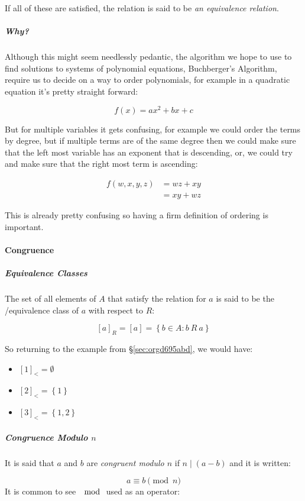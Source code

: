 \documentclass[a4paper,11pt,twoside]{article}
\begin{document}
If all of these are satisfied, the relation is said to be \emph{an
equivalence relation}.

\subparagraph{Why?}
\label{sec:org3e60f95}
Although this might seem needlessly pedantic, the algorithm we
hope to use to find solutions to systems of polynomial
equations, Buchberger's Algorithm, require us to decide on a
way to order polynomials, for example in a quadratic equation
it's pretty straight forward:

\[
      f(x) = ax^2 + bx +c
      \]

But for multiple variables it gets confusing, for example we could
order the terms by degree, but if multiple terms are of the same
degree then we could make sure that the left most variable has an
exponent that is descending, or, we could try and make sure that
the right most term is ascending:

\begin{align}
 f\left(w,x,y,z\right)	&=wz+xy \\
			 &=xy+wz
\end{align}

This is already pretty confusing so having a firm definition of
ordering is important.

\paragraph{Congruence}
\label{sec:orge4b717b}
\subparagraph{Equivalence Classes}
\label{sec:orgd13e14e}
The set of all elements of \(A\) that satisfy the relation for
\(a\) is said to be the /equivalence class of \(a\) with respect to \(R\):

\[\left\lbrack a \right\rbrack_{R} = \left\lbrack a \right\rbrack = \left\{ b \in A:b\ R\ a \right\}\]

So returning to the example from \S \ref{sec:orgd695abd}, we would have:

\begin{itemize}
\item \([1]_<=\emptyset\)
\item \([2]_<=\left\{1\right\}\)
\item \([3]_<=\left\{1, 2\right\}\)
\end{itemize}
\subparagraph{Congruence Modulo \(n\)}
\label{sec:org1465ebd}
It is said that \(a\) and \(b\) are \emph{congruent modulo \(n\)} if
\(n\mid \left(a-b\right)\) and it is written:

\[
      a\equiv b \pmod{n}
      \]
It is common to see \(\mod\) used as an operator:
\end{document}
